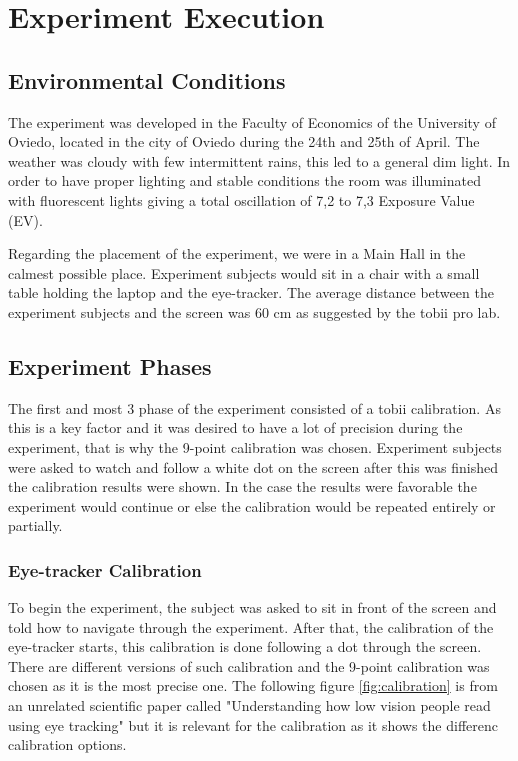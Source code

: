 \chapter{Experiment Execution}
\label{chap:experiment_execution}

\section{Environmental Conditions}
The experiment was developed in the Faculty of Economics of the University of Oviedo, 
located in the city of Oviedo during the 24th and 25th of April. The weather was cloudy 
with few intermittent rains, this led to a general dim light. In order to have proper 
lighting and stable conditions the room was illuminated with fluorescent lights giving a 
total oscillation of 7,2 to 7,3 Exposure Value (EV).

Regarding the placement of the experiment, we were in a Main Hall in the calmest possible 
place. Experiment subjects would sit in a chair with a small table holding the laptop and 
the eye-tracker. The average distance between the experiment subjects and the screen was 
60 cm as suggested by the tobii pro lab.

\section{Experiment Phases}
\label{sec:experiment_phases}
The first and most 3 phase of the experiment consisted of a tobii calibration. As this is a
 key factor and it was desired to have a lot of precision during the experiment, that is why 
 the 9-point calibration was chosen. Experiment subjects were asked to watch and follow a 
 white dot on the screen after this was finished the calibration results were shown. In the 
 case the results were favorable the experiment would continue or else the calibration would 
 be repeated entirely or partially.

\subsection{Eye-tracker Calibration}
\label{sub:eye-tracker_calibration}
To begin the experiment, the subject was asked to sit in front of the screen and told how to navigate through 
the experiment. After that, the calibration of the eye-tracker starts, this calibration is done following a dot through 
the screen. There are different versions of such calibration and the 9-point calibration was chosen as it is the most
precise one. The following figure  \ref{fig:calibration} is from an unrelated scientific paper called "Understanding
 how low vision people read using eye tracking"\cite{Wang2023} but it is relevant for the calibration as it shows 
 the differenc calibration options.

